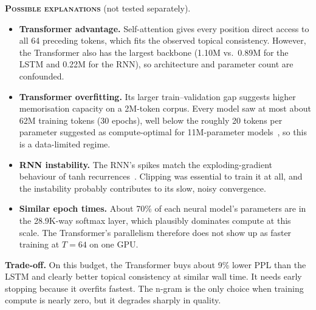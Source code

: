\documentclass[10pt,a4paper]{article}
\newcommand{\obs}[1]{\textsc{\textbf{#1}}}
\begin{document}
\obs{Possible explanations} (not tested separately).
\begin{itemize}
\item \textbf{Transformer advantage.} Self-attention gives every position direct access to all 64 preceding tokens, which fits the observed topical consistency. However, the Transformer also has the largest backbone (1.10M vs.\ 0.89M for the LSTM and 0.22M for the RNN), so architecture and parameter count are confounded.
\item \textbf{Transformer overfitting.} Its larger train--validation gap suggests higher memorisation capacity on a 2M-token corpus. Every model saw at most about 62M training tokens (30 epochs), well below the roughly 20 tokens per parameter suggested as compute-optimal for 11M-parameter models~\cite{hoffmann2022}, so this is a data-limited regime.
\item \textbf{RNN instability.} The RNN's spikes match the exploding-gradient behaviour of tanh recurrences~\cite{pascanu2013}. Clipping was essential to train it at all, and the instability probably contributes to its slow, noisy convergence.
\item \textbf{Similar epoch times.} About 70\% of each neural model's parameters are in the 28.9K-way softmax layer, which plausibly dominates compute at this scale. The Transformer's parallelism therefore does not show up as faster training at $T=64$ on one GPU.
\end{itemize}
\textbf{Trade-off.} On this budget, the Transformer buys about 9\% lower PPL than the LSTM and clearly better topical consistency at similar wall time. It needs early stopping because it overfits fastest. The n-gram is the only choice when training compute is nearly zero, but it degrades sharply in quality.

\end{document}
